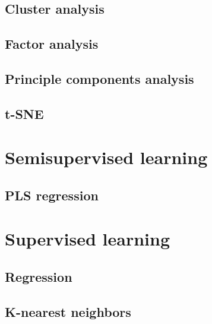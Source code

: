 \documentclass[
]{book}
\begin{document}
\hypertarget{cluster-analysis}{%
\subsection{Cluster analysis}\label{cluster-analysis}}

\hypertarget{factor-analysis}{%
\subsection{Factor analysis}\label{factor-analysis}}

\hypertarget{principle-components-analysis}{%
\subsection{Principle components analysis}\label{principle-components-analysis}}

\hypertarget{t-sne}{%
\subsection{t-SNE}\label{t-sne}}

\hypertarget{semisupervised-learning}{%
\section{Semisupervised learning}\label{semisupervised-learning}}

\hypertarget{pls-regression}{%
\subsection{PLS regression}\label{pls-regression}}

\hypertarget{supervised-learning}{%
\section{Supervised learning}\label{supervised-learning}}

\hypertarget{regression}{%
\subsection{Regression}\label{regression}}

\hypertarget{k-nearest-neighbors}{%
\subsection{K-nearest neighbors}\label{k-nearest-neighbors}}
\end{document}
